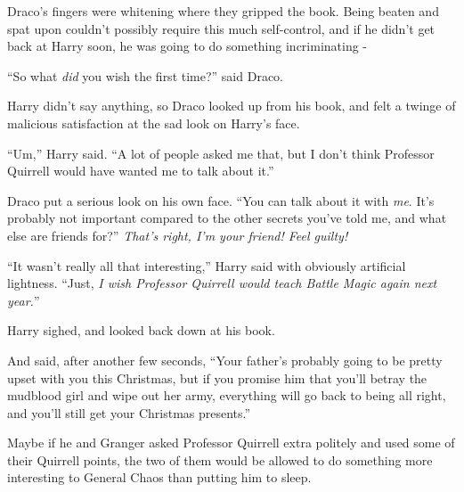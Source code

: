 Draco's fingers were whitening where they gripped the book. Being beaten and spat upon couldn't possibly require this much self-control, and if he didn't get back at Harry soon, he was going to do something incriminating -

``So what \emph{did} you wish the first time?'' said Draco.

Harry didn't say anything, so Draco looked up from his book, and felt a twinge of malicious satisfaction at the sad look on Harry's face.

``Um,'' Harry said. ``A lot of people asked me that, but I don't think Professor Quirrell would have wanted me to talk about it.''

Draco put a serious look on his own face. ``You can talk about it with \emph{me}. It's probably not important compared to the other secrets you've told me, and what else are friends for?'' \emph{That's right, I'm your friend! Feel guilty!}

``It wasn't really all that interesting,'' Harry said with obviously artificial lightness. ``Just, \emph{I wish Professor Quirrell would teach Battle Magic again next year.}''

Harry sighed, and looked back down at his book.

And said, after another few seconds, ``Your father's probably going to be pretty upset with you this Christmas, but if you promise him that you'll betray the mudblood girl and wipe out her army, everything will go back to being all right, and you'll still get your Christmas presents.''

Maybe if he and Granger asked Professor Quirrell extra politely and used some of their Quirrell points, the two of them would be allowed to do something more interesting to General Chaos than putting him to sleep.
